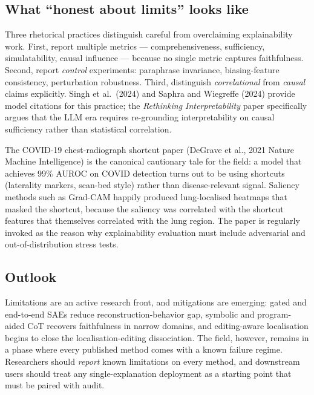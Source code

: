 \documentclass{article}
\begin{document}
\subsection{What ``honest about limits'' looks like}\label{what-honest-about-limits-looks-like}

Three rhetorical practices distinguish careful from overclaiming explainability work. First, report multiple metrics --- comprehensiveness, sufficiency, simulatability, causal influence --- because no single metric captures faithfulness. Second, report \emph{control} experiments: paraphrase invariance, biasing-feature consistency, perturbation robustness. Third, distinguish \emph{correlational} from \emph{causal} claims explicitly. Singh et al.~(2024) and Saphra and Wiegreffe (2024) provide model citations for this practice; the \emph{Rethinking Interpretability} paper specifically argues that the LLM era requires re-grounding interpretability on causal sufficiency rather than statistical correlation.

The COVID-19 chest-radiograph shortcut paper (DeGrave et al., 2021 Nature Machine Intelligence) is the canonical cautionary tale for the field: a model that achieves 99\% AUROC on COVID detection turns out to be using shortcuts (laterality markers, scan-bed style) rather than disease-relevant signal. Saliency methods such as Grad-CAM happily produced lung-localised heatmaps that masked the shortcut, because the saliency was correlated with the shortcut features that themselves correlated with the lung region. The paper is regularly invoked as the reason why explainability evaluation must include adversarial and out-of-distribution stress tests.

\subsection{Outlook}\label{outlook-2}

Limitations are an active research front, and mitigations are emerging: gated and end-to-end SAEs reduce reconstruction-behavior gap, symbolic and program-aided CoT recovers faithfulness in narrow domains, and editing-aware localisation begins to close the localisation-editing dissociation. The field, however, remains in a phase where every published method comes with a known failure regime. Researchers should \emph{report} known limitations on every method, and downstream users should treat any single-explanation deployment as a starting point that must be paired with audit.
\end{document}
